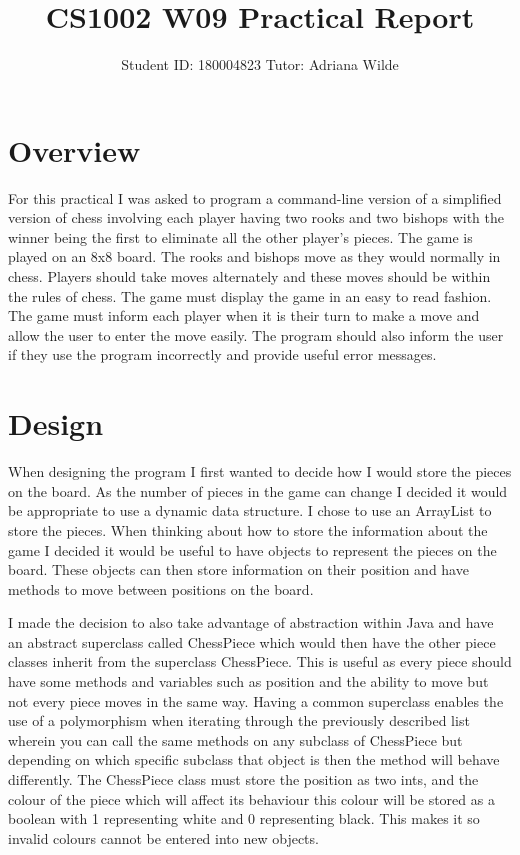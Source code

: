 \documentclass[a4paper]{article}
\title{CS1002 W09 Practical Report}
\author{Student ID: 180004823 Tutor: Adriana Wilde}
\begin{document}
\maketitle

\section*{Overview}
For this practical I was asked to program a command-line version of a simplified version of chess involving each player having two rooks and two bishops with the winner being the first to eliminate all the other player's pieces. The game is played on an 8x8 board. The rooks and bishops move as they would normally in chess. Players should take moves alternately and these moves should be within the rules of chess. The game must display the game in an easy to read fashion. The game must inform each player when it is their turn to make a move and allow the user to enter the move easily. The program should also inform the user if they use the program incorrectly and provide useful error messages. 

\section*{Design}
When designing the program I first wanted to decide how I would store the pieces on the board. As the number of pieces in the game can change I decided it would be appropriate to use a dynamic data structure. I chose to use an ArrayList to store the pieces. When thinking about how to store the information about the game I decided it would be useful to have objects to represent the pieces on the board. These objects can then store information on their position and have methods to move between positions on the board.

I made the decision to also take advantage of abstraction within Java and have an abstract superclass called ChessPiece which would then have the other piece classes inherit from the superclass ChessPiece. This is useful as every piece should have some methods and variables such as position and the ability to move but not every piece moves in the same way. Having a common superclass enables the use of a polymorphism when iterating through the previously described list wherein you can call the same methods on any subclass of ChessPiece but depending on which specific subclass that object is then the method will behave differently. The ChessPiece class must store the position as two ints, and the colour of the piece which will affect its behaviour this colour will be stored as a boolean with 1 representing white and 0 representing black. This makes it so invalid colours cannot be entered into new objects.
\end{document}
